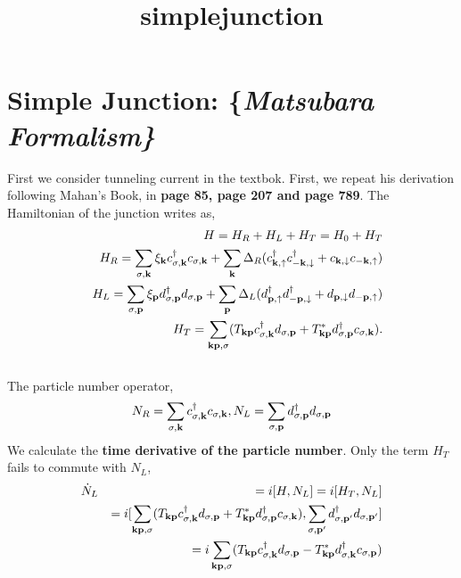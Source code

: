 \documentclass[11pt]{article}
\title{simplejunction}
\begin{document}
    
    
    \maketitle
    
    

    
    \hypertarget{simple-junction}{%
\section{\texorpdfstring{Simple Junction:
\{\it Matsubara Formalism\}}{Simple Junction: \{\}}}\label{simple-junction}}

    First we consider tunneling current in the textbok. First, we repeat his
derivation following Mahan's Book, in \textbf{page 85, page 207 and page
789}. The Hamiltonian of the junction writes as, \begin{eqnarray}
&& H=H_R+H_L+H_T=H_0+H_T\\\nonumber
&&H_R=\sum_{\sigma,{\bf k}}\xi_{\bf k} c^{\dagger}_{\sigma,{\bf
k}}c_{\sigma,{\bf k}}+\sum_{{\bf k}} \Delta_R ( c^{\dagger}_{{\bf
k},\uparrow}c^{\dagger}_{{\bf -k},\downarrow}+ c_{{\bf
k},\downarrow} c_{{\bf -k},\uparrow})\\\nonumber
&&H_L=\sum_{\sigma,{\bf p}}\xi_{\bf p} d^{\dagger}_{\sigma,{\bf
p}}d_{\sigma,{\bf p}}+\sum_{{\bf p}}
\Delta_L (d^{\dagger}_{{\bf p},\uparrow}d^{\dagger}_{{\bf -p},\downarrow} + d_{{\bf p},\downarrow}d_{{\bf -p},\uparrow})\\\nonumber
&&H_T=\sum_{{\bf k}{\bf p},\sigma}(T_{{\bf k}{\bf
p}}c^{\dagger}_{\sigma,{\bf k}}d_{\sigma,{\bf p}}+T^*_{{\bf k}{\bf
p}}d^{\dagger}_{\sigma,{\bf p}}c_{\sigma,{\bf k}}).
 \end{eqnarray}\\
The particle number operator, \begin{eqnarray} N_R=\sum_{\sigma,{\bf k}}
c^{\dagger}_{\sigma,{\bf k}}c_{\sigma,{\bf k}},
N_L=\sum_{\sigma,{\bf p}} d^{\dagger}_{\sigma,{\bf p}}d_{\sigma,{\bf
p}}
\end{eqnarray} We calculate the \textbf{time derivative of the particle
number}. Only the term \(H_T\) fails to commute with \(N_L\),
\begin{eqnarray}
\dot N_L&&=i[H,N_L]=i[H_T,N_L] \\\nonumber && =i[\sum_{{\bf k}{\bf p},\sigma}(T_{{\bf
k}{\bf p}}c^{\dagger}_{\sigma,{\bf k}}d_{\sigma,{\bf p}}+T^*_{{\bf
k}{\bf p}}d^{\dagger}_{\sigma,{\bf p}}c_{\sigma,{\bf
k}}),\sum_{\sigma,{\bf p'}} d^{\dagger}_{\sigma,{\bf
p'}}d_{\sigma,{\bf p'}}]\\\nonumber &&= i\sum_{{\bf k}{\bf p},\sigma}(T_{{\bf
k}{\bf p}}c^{\dagger}_{\sigma,{\bf k}}d_{\sigma,{\bf p}}-T^*_{{\bf
k}{\bf p}}d^{\dagger}_{\sigma,{\bf k}}c_{\sigma,{\bf p}})
\end{eqnarray}
\end{document}
